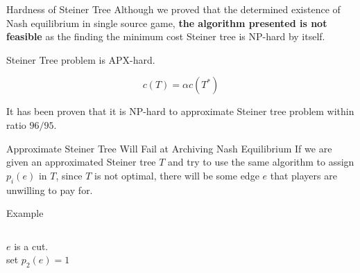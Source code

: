 \documentclass[11pt,aspectratio=169]{beamer}
\begin{document}
\begin{frame}{Hardness of Steiner Tree}
    Although we proved that the determined existence of Nash equilibrium in single source game, \textbf{the algorithm presented is not feasible} as the finding the minimum cost Steiner tree is NP-hard by itself. \\
    \vspace{10pt}
    \begin{fact}
        Steiner Tree problem is APX-hard.
    \end{fact}

    \begin{equation*}
        c(T) = \alpha c(T^*)
    \end{equation*}

    It has been proven that it is NP-hard to approximate Steiner tree problem within ratio \(96/95\). \\
    
   
\end{frame}

\begin{frame}{Approximate Steiner Tree Will Fail at Archiving Nash Equilibrium}
If we are given an approximated Steiner tree \(T\) and try to use the same algorithm to assign \(p_i(e)\) in \(T\), since \(T\) is not optimal, there will be some edge \(e\) that players are unwilling to pay for. \\
\vspace{20pt}
\centering
{}
\end{frame}

\begin{frame}{Example}
\begin{columns}
    \centering
\doublespacing
$e$ is a cut.\\
set $p_2(e) = 1$
\end{columns}
\end{frame}
\end{document}
